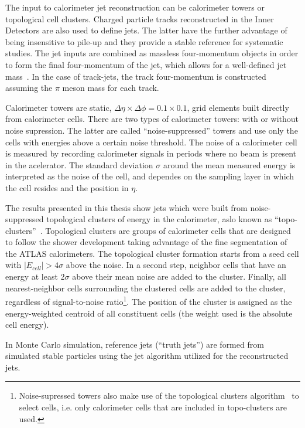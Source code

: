 The input to calorimeter jet reconstruction can be calorimeter towers or topological cell clusters. Charged particle tracks reconstructed in the Inner Detectors are also used to define jets. The latter have the further advantage of being insensitive to pile-up and they provide a stable reference for systematic studies. The jet inputs are combined as massless four-momentum objects in order to form the final four-momentum of the jet, which allows for a well-defined jet mass~\cite{Busato:1271710}. In the case of track-jets, the track four-momentum is constructed assuming the $\pi$ meson mass for each track.

Calorimeter towers are static, $\Delta \eta \times \Delta \phi = 0.1 \times 0.1$, grid elements built directly from calorimeter cells. There are two types of calorimeter towers: with or without noise supression. The latter are called ``noise-suppressed'' towers and use only the cells with energies above a certain noise threshold.  The noise of a calorimeter cell is measured by recording calorimeter signals in periods where no beam is present in the acelerator.  The standard deviation $\sigma$ around the mean measured energy is interpreted as the noise of the cell, and dependes on the sampling layer in which the cell resides and the position in $\eta$.

The results presented in this thesis show jets which were built from noise-suppressed topological clusters of energy in the calorimeter, aslo known as ``topo-clusters''~\cite{topoClusters}. Topological clusters are groups of calorimeter cells that are designed to follow the shower development taking advantage of the fine segmentation of the ATLAS calorimeters. The topological cluster formation starts from a seed cell with $|E_{cell}| > 4 \sigma$ above the noise. In a second step, neighbor cells that have an energy at least 2$\sigma$ above their mean noise are added to the cluster. Finally, all nearest-neighbor cells surrounding the clustered cells are added to the cluster, regardless of signal-to-noise ratio\footnote{Noise-supressed towers also make use of the topological clusters algorithm~\cite{topoClusters} to select cells, i.e. only calorimeter cells that are included in topo-clusters are used.}. The position of the cluster is assigned as the energy-weighted centroid of all constituent cells (the weight used is the absolute cell energy).

In Monte Carlo simulation, reference jets (``truth jets'') are formed from simulated stable particles using the jet algorithm utilized for the reconstructed jets. 

